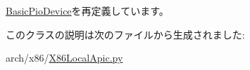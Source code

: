 \hyperlink{classDevice_1_1BasicPioDevice_acce15679d830831b0bbe8ebc2a60b2ca}{BasicPioDevice}を再定義しています。

このクラスの説明は次のファイルから生成されました:\begin{DoxyCompactItemize}
\item 
arch/x86/\hyperlink{X86LocalApic_8py}{X86LocalApic.py}\end{DoxyCompactItemize}
